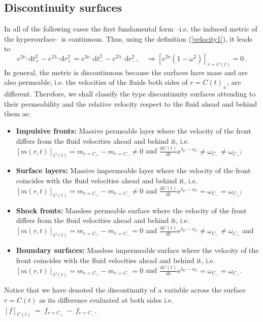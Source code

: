 \documentclass[notitlepage,letterpaper, 10pt]{article}
\begin{document}
\subsection{Discontinuity surfaces}
In all of the following cases the first fundamental form --i.e. the induced metric of the hypersurface-- is continuous.  Thus, using the definition (\ref{velocity1}), it leads to
\begin{equation}
e^{2\nu_{+}}\textrm{d}t^{2}_{+}-e^{2\lambda_{+}}\textrm{d}r^{2}_{+} = e^{2\nu_{-}}\textrm{d}t^{2}_{-}-e^{2\lambda_{-}}\textrm{d}r^{2}_{-}, \quad \Rightarrow
\left[  e^{2\nu} \left(  1- \omega^2    \right)\right]_{r=C(t)}=0 \, .
\label{FirstFundForm}
\end{equation}
In general, the metric is discontinuous because the surfaces have mass and are also permeable, i.e. the velocities of the fluids both sides of $r= C(t)_{\pm}$, are different. Therefore, we shall classify the type discontinuity surfaces attending to their permeability and the relative velocity respect to the fluid ahead and behind them as:
\begin{itemize}
    \item \textbf{Impulsive fronts:} Massive permeable layer where the velocity of the front differs from the fluid velocities ahead and behind it, i.e. \\
    $\left[ m(r,t) \right]_{C(t)} = m_{r=C_{+}} - m_{r=C_{-}} \neq 0$ and $\frac{\textrm{d}C(t)}{\textrm{d}t}\mathrm{e}^{\lambda_C -\nu_C} \neq \omega_{C_{-}} \neq \omega_{C_{+}} $;
    \item \textbf{Surface layers:}  Massive impermeable layer where the velocity of the front coincides with the fluid velocities ahead and behind it, i.e. \\
    $\left[ m(r,t) \right]_{C(t)} = m_{r=C_{+}} - m_{r=C_{-}} \neq 0$ and $\frac{\textrm{d}C(t)}{\textrm{d} t}\mathrm{e}^{\lambda_C -\nu_C} = \omega_{C_{-}} = \omega_{C_{+}} $;
    \item \textbf{Shock fronts:} Massless permeable surface where the velocity of the front differs from the fluid velocities ahead and behind it, i.e. \\
    $\left[ m(r,t) \right]_{C(t)} = m_{r=C_{+}} - m_{r=C_{-}} = 0$ and $\frac{\textrm{d}C(t)}{\textrm{d} t}\mathrm{e}^{\lambda_C -\nu_C} \neq \omega_{C_{-}} \neq \omega_{C_{+}} $ and
    \item \textbf{Boundary surfaces:} Massless impermeable surface where the velocity of the front coincides with the fluid velocities ahead and behind it, i.e. \\
    $\left[ m(r,t) \right]_{C(t)} = m_{r=C_{+}} - m_{r=C_{-}} = 0$ and $\frac{\textrm{d}C(t)}{\textrm{d} t}\mathrm{e}^{\lambda_C -\nu_C} = \omega_{C_{-}} = \omega_{C_{+}} $.
\end{itemize}
Notice that we have denoted the discontinuity of a variable across the surface $r= C(t)$ as its difference evaluated at both sides i.e. 
$\left[ f \right]_{C(t)}~=~f_{r=C_{+}}~- ~f_{r=C_{-}}$.
\end{document}
